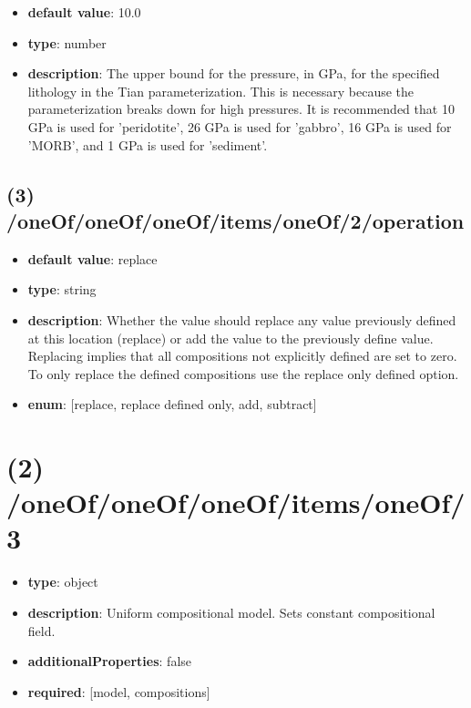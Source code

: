 \begin{itemize}[leftmargin=3em]\item {\bf default value}: 10.0
\item {\bf type}: number
\item {\bf description}: The upper bound for the pressure, in GPa, for the specified lithology in the Tian parameterization. This is necessary because the parameterization breaks down for high pressures. It is recommended that 10 GPa is used for 'peridotite', 26 GPa is used for 'gabbro', 16 GPa is used for 'MORB', and 1 GPa is used for 'sediment'.
\end{itemize}\subsection{(3) /oneOf/oneOf/oneOf/items/oneOf/2/operation}
\begin{itemize}[leftmargin=3em]\item {\bf default value}: replace
\item {\bf type}: string
\item {\bf description}: Whether the value should replace any value previously defined at this location (replace) or add the value to the previously define value. Replacing implies that all compositions not explicitly defined are set to zero. To only replace the defined compositions use the replace only defined option.
\item {\bf enum}: [replace, replace defined only, add, subtract]\end{itemize}\section{(2) /oneOf/oneOf/oneOf/items/oneOf/3}
\begin{itemize}[leftmargin=2em]\item {\bf type}: object
\item {\bf description}: Uniform compositional model. Sets constant compositional field.
\item {\bf additionalProperties}: false
\item {\bf required}: [model, compositions]\end{itemize}

